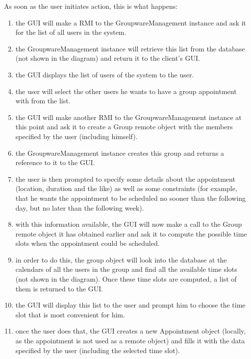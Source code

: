 \documentclass[a4paper,10pt]{article}
\begin{document}
As soon as the user initiates action, this is what happens:

\begin{enumerate}

\item the GUI will make a RMI to the GroupwareManagement instance and ask it for the
list of all users in the system.

\item the GroupwareManagement instance will retrieve this list from the database (not
shown in the diagram) and return it to the client's GUI.

\item the GUI displays the list of users of the system to the user.

\item the user will select the other users he wants to have a group appointment with from
the list.

\item the GUI will make another RMI to the GroupwareManagement instance at this point
and ask it to create a Group remote object with the members specified by the user (including
himself).

\item the GroupwareManagement instance creates this group and returns a reference to it
to the GUI.

\item the user is then prompted to specify some details about the appointment (location, duration
and the like) as well as some constraints (for example, that he wants the appointment to be
scheduled no sooner than the following day, but no later than the following week).

\item with this information available, the GUI will now make a call to the Group remote
object it has obtained earlier and ask it to compute the possible time slots when the appointment
could be scheduled.

\item in order to do this, the group object will look into the database at the calendars of
all the users in the group and find all the available time slots (not shown in the diagram).
Once these time slots are computed, a list of them is returned to the GUI.

\item the GUI will display this list to the user and prompt him to choose the time slot that is
most convenient for him.

\item once the user does that, the GUI creates a new Appointment object (locally, as the appointment
is not used as a remote object) and fills it with the data specified by the user (including the selected
time slot).


\end{enumerate}
\end{document}
